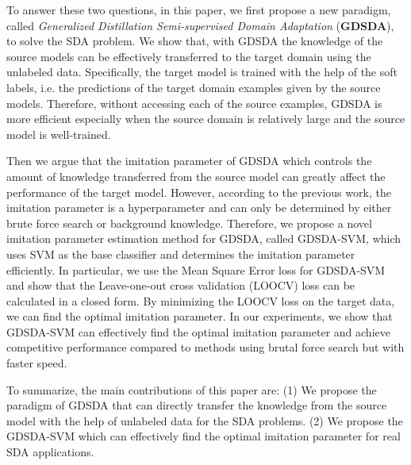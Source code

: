 To answer these two questions, in this paper, we first propose a new paradigm, called \textit{Generalized Distillation Semi-supervised Domain Adaptation} (\textbf{GDSDA}), to solve the SDA problem. 
We show that, with GDSDA the knowledge of the source models can be effectively transferred to the target domain using the unlabeled data. Specifically, the target model is trained with the help of the soft labels, i.e. the predictions of the target domain examples given by the source models. Therefore, without accessing each of the source examples, GDSDA is more efficient especially when the source domain is relatively large and the source model is well-trained.

Then we argue that the imitation parameter of GDSDA which controls the amount of knowledge transferred from the source model can greatly affect the performance of the target model.
However, according to the previous work\mbox{\cite{lopez2015unifying,Tzeng_2015_ICCV}}, the imitation parameter is a hyperparameter and can only be determined by either brute force search or background knowledge. 
Therefore, we propose a novel imitation parameter estimation method for GDSDA, called GDSDA-SVM, which uses SVM as the base classifier and determines the imitation parameter efficiently. In particular, we use the Mean Square Error loss for GDSDA-SVM and show that the Leave-one-out cross validation (LOOCV) loss can be calculated in a closed form. By minimizing the LOOCV loss on the target data, we can find the optimal imitation parameter. In our experiments, we show that GDSDA-SVM can effectively find the optimal imitation parameter and achieve competitive performance compared to methods using brutal force search but with faster speed. 

To summarize, the main contributions of this paper are: (1) We propose the paradigm of GDSDA that can directly transfer the knowledge from the source model with the help of unlabeled data for the SDA problems. (2) We propose the GDSDA-SVM which can effectively find the optimal imitation parameter for real SDA applications.

